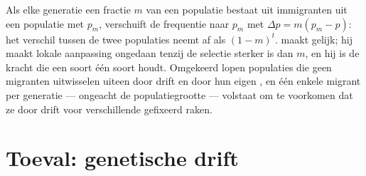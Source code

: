 \begin{proposition}\label{prop:b2:population-genetics:migration}
Als elke generatie een fractie $m$ van een populatie bestaat uit immigranten
uit een populatie met  $p_{m}$, verschuift de frequentie
naar $p_{m}$ met $\Delta p = m(p_{m} - p)$: het verschil
tussen de twee populaties neemt af als $(1 - m)^{t}$. \emph{}
maakt gelijk; hij maakt lokale aanpassing ongedaan tenzij de selectie
sterker is dan $m$, en hij is de kracht die een soort één soort houdt.
Omgekeerd lopen populaties die geen migranten uitwisselen uiteen door drift
en door hun eigen , en één enkele migrant per generatie --- ongeacht
de populatiegrootte --- volstaat om te voorkomen dat ze door drift voor
verschillende  gefixeerd raken.
\end{proposition}

\section{Toeval: genetische drift}

